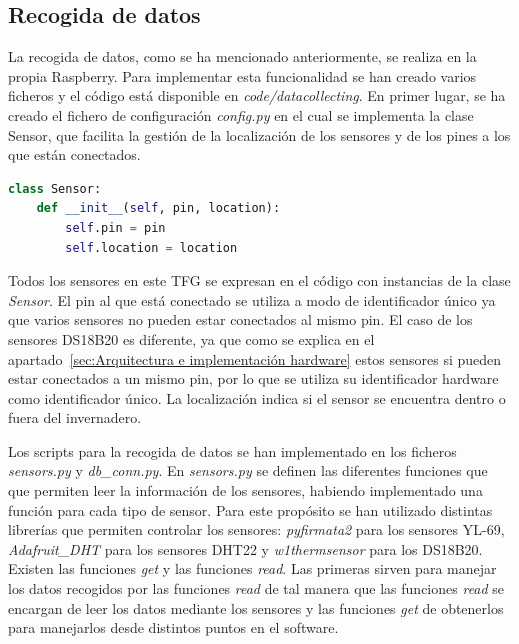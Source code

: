 \documentclass[a4paper, 12pt, oneside]{book}
\begin{document}
\subsection{Recogida de datos}
\label{subsec:recogida de datos}
La recogida de datos, como se ha mencionado anteriormente, se realiza en la propia Raspberry. Para implementar esta funcionalidad se han creado varios ficheros y el código está disponible en \textit{code/datacollecting}. En primer lugar, se ha creado el fichero de configuración \textit{config.py} en el cual se implementa la clase Sensor, que facilita la gestión de la localización de los sensores y de los pines a los que están conectados.

\begin{lstlisting}[language=Python]
class Sensor:
    def __init__(self, pin, location):
        self.pin = pin
        self.location = location
\end{lstlisting}

Todos los sensores en este TFG se expresan en el código con instancias de la clase \textit{Sensor}. El pin al que está conectado se utiliza a modo de identificador único ya que varios sensores no pueden estar conectados al mismo pin. El caso de los sensores DS18B20 es diferente, ya que como se explica en el apartado~\ref{sec:Arquitectura e implementación hardware} estos sensores si pueden estar conectados a un mismo pin, por lo que se utiliza su identificador hardware como identificador único. La localización indica si el sensor se encuentra dentro o fuera del invernadero.

Los scripts para la recogida de datos se han implementado en los ficheros \textit{sensors.py} y \textit{db\_conn.py}. En \textit{sensors.py} se definen las diferentes funciones que que permiten leer la información de los sensores, habiendo implementado una función para cada tipo de sensor. Para este propósito se han utilizado distintas librerías que permiten controlar los sensores: \textit{pyfirmata2} para los sensores YL-69, \textit{Adafruit\_DHT} para los sensores DHT22 y \textit{w1thermsensor} para los DS18B20.
Existen las funciones \textit{get} y las funciones \textit{read}. Las primeras sirven para manejar los datos recogidos por las funciones \textit{read} de tal manera que las funciones \textit{read} se encargan de leer los datos mediante los sensores y las funciones \textit{get} de obtenerlos para manejarlos desde distintos puntos en el software.
\end{document}
